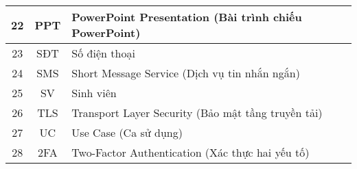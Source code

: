 \begin{table}[h!]
\begin{tabular}{|c|c|l|}
\hline
22 & PPT & PowerPoint Presentation (Bài trình chiếu PowerPoint) \\ 
\hline
23 & SĐT & Số điện thoại \\ 
\hline
24 & SMS & Short Message Service (Dịch vụ tin nhắn ngắn) \\ 
\hline
25 & SV & Sinh viên \\ 
\hline
26 & TLS & Transport Layer Security (Bảo mật tầng truyền tải) \\ 
\hline
27 & UC & Use Case (Ca sử dụng) \\ 
\hline
28 & 2FA & Two-Factor Authentication (Xác thực hai yếu tố) \\ 
\hline
\end{tabular}
\end{table}

\pagebreak

\listoffigures
\listoftables
\pagebreak
{}
